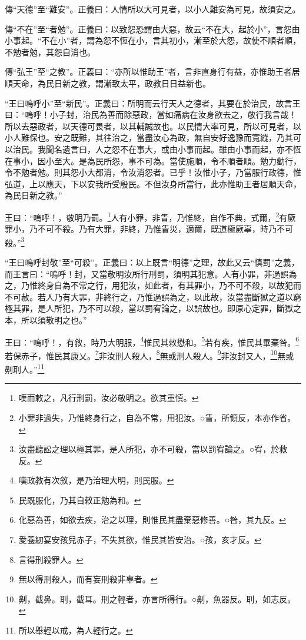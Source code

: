 {\noindent\zhuan{}\fzbyks 傳“天德”至“難安”。正義曰：人情所以大可見者，以小人難安為可見，故須安之。 \par}

{\noindent\zhuan{}\fzbyks 傳“不在”至“者勉”。正義曰：以致怨恐謂由大惡，故云“不在大，起於小”，言怨由小事起。“不在小”者，謂為怨不恆在小，言其初小，漸至於大怨，故使不順者順，不勉者勉，其怨自消也。 \par}

{\noindent\zhuan{}\fzbyks 傳“弘王”至“之教”。正義曰：“亦所以惟助王”者，言非直身行有益，亦惟助王者居順天命，為民日新之教，謂漸致太平，政教日日益新也。 \par}

{\noindent\shu{}\fzkt “王曰嗚呼小”至“新民”。正義曰：所明而云行天人之德者，其要在於治民，故言王曰：“嗚呼！小子封，治民為善而除惡政，當如痛病在汝身欲去之，敬行我言哉！所以去惡政者，以天德可畏者，以其輔誠故也。以民情大率可見，所以可見者，以小人難保也。安之既難，其往治之，當盡汝心為政，無自安好逸豫而寬縱，乃其可以治民。我聞名遺言曰，人之怨不在事大，或由小事而起。雖由小事而起，亦不恆在事小，因小至大。是為民所怨，事不可為。當使施順，令不順者順。勉力勸行，令不勉者勉。則其怨小大都消，令汝消怨者。已乎！汝惟小子，乃當服行政德，惟弘道，上以應天，下以安我所受殷民。不但汝身所當行，此亦惟助王者居順天命，為民日新之教。” \par}

王曰：“嗚呼！，敬明乃罰。\footnote{嘆而敕之，凡行刑罰，汝必敬明之。欲其重慎。}人有小罪，非眚，乃惟終，自作不典，式爾，\footnote{小罪非過失，乃惟終身行之，自為不常，用犯汝。○眚，所領反，本亦作省。}有厥罪小，乃不可不殺。乃有大罪，非終，乃惟眚災，適爾，既道極厥辜，時乃不可殺。”\footnote{汝盡聽訟之理以極其罪，是人所犯，亦不可殺，當以罰宥論之。○宥，於救反。}

{\noindent\shu{}\fzkt “王曰嗚呼封敬”至“可殺”。正義曰：以上既言“明德”之理，故此又云“慎罰”之義，而王言曰：“嗚呼！封，又當敬明汝所行刑罰，須明其犯意。人有小罪，非過誤為之，乃惟終身自為不常之行，用犯汝，如此者，有其罪小，乃不可不殺，以故犯而不可赦。若人乃有大罪，非終行之，乃惟過誤為之，以此故，汝當盡斷獄之道以窮極其罪，是人所犯，乃不可以殺，當以罰宥論之，以誤故也。即原心定罪，斷獄之本，所以須敬明之也。” \par}

王曰：“嗚呼！，有敘，時乃大明服，\footnote{嘆政教有次敘，是乃治理大明，則民服。}惟民其敕懋和。\footnote{民既服化，乃其自敕正勉為和。}若有疾，惟民其畢棄咎。\footnote{化惡為善，如欲去疾，治之以理，則惟民其盡棄惡修善。○咎，其九反。}若保赤子，惟民其康乂。\footnote{愛養紉宴安孩兒赤子，不失其欲，惟民其皆安治。○孩，亥才反。}非汝刑人殺人，\footnote{言得刑殺罪人。}無或刑人殺人。\footnote{無以得刑殺人，而有妄刑殺非辜者。}非汝封又人，\footnote{劓，截鼻。刵，截耳。刑之輕者，亦言所得行。○劓，魚器反。刵，如志反。}無或劓刵人。”\footnote{所以舉輕以戒，為人輕行之。}


